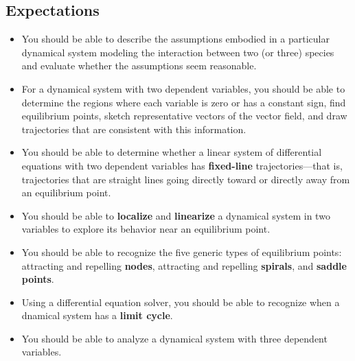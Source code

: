 \subsection{Expectations}
\label{subsec:expectations}

\begin{itemize}

\item You should be able to describe the assumptions embodied in a
  particular dynamical system modeling the interaction between two (or
  three) species and evaluate whether the assumptions seem reasonable.

\item For a dynamical system with two dependent variables, you should
  be able to determine the regions where each variable is zero or has
  a constant sign, find equilibrium points, sketch representative
  vectors of the vector field, and draw trajectories that are
  consistent with this information.

\item You should be able to determine whether a linear system of
  differential equations with two dependent variables has
  \textbf{fixed-line} trajectories---that is, trajectories that are
  straight lines going directly toward or directly away from an
  equilibrium point.

\item You should be able to \textbf{localize} and \textbf{linearize} a
  dynamical system in two variables to explore its behavior near an
  equilibrium point.

\item You should be able to recognize the five generic types of
  equilibrium points: attracting and repelling \textbf{nodes},
  attracting and repelling \textbf{spirals}, and \textbf{saddle
    points}.

\item Using a differential equation solver, you should be able to
  recognize when a dnamical system has a \textbf{limit cycle}.

\item You should be able to analyze a dynamical system with three
  dependent variables.

\end{itemize}

\cleardoublepage